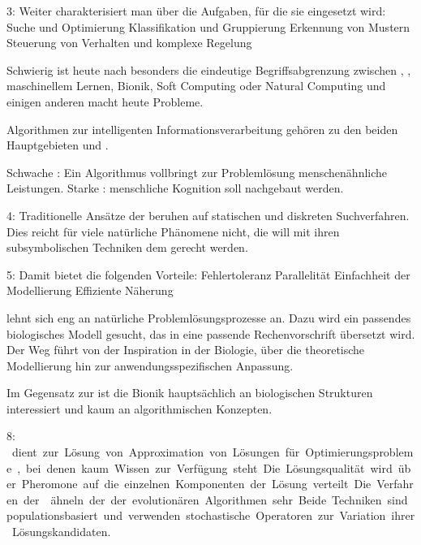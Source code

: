 3: Weiter charakterisiert man \II{} über die Aufgaben, für
die sie eingesetzt wird:
    Suche und Optimierung
    Klassifikation und Gruppierung
    Erkennung von Mustern
    Steuerung von Verhalten und komplexe Regelung

Schwierig ist heute nach
\citeauthor{bib:Kramer_2009_intelligence}
besonders die eindeutige Begriffsabgrenzung
zwischen \AI{}, \CI{}, maschinellem
Lernen, Bionik, Soft Computing oder Natural Computing und
einigen anderen macht heute Probleme.

Algorithmen zur intelligenten Informationsverarbeitung
gehören zu den beiden Hauptgebieten \CI{} und \AI{}.

Schwache \AI{}: Ein Algorithmus vollbringt zur Problemlösung
menschenähnliche Leistungen.
Starke \AI{}: menschliche Kognition soll nachgebaut werden.

4: Traditionelle Ansätze der \AI{} beruhen auf statischen
und diskreten Suchverfahren. Dies reicht für viele
natürliche Phänomene nicht, die \CI{} will mit ihren
subsymbolischen Techniken dem gerecht werden.

5: Damit bietet die \CI{} folgenden Vorteile:
    Fehlertoleranz
    Parallelität
    Einfachheit der Modellierung
    Effiziente Näherung

\CI{} lehnt sich eng an natürliche Problemlösungsprozesse
an. Dazu wird ein passendes biologisches Modell gesucht, das
in eine passende Rechenvorschrift übersetzt wird. Der Weg
führt von der Inspiration in der Biologie, über die
theoretische Modellierung hin zur anwendungsspezifischen
Anpassung.

Im Gegensatz zur \CI{} ist die Bionik hauptsächlich an
biologischen Strukturen interessiert und kaum an
algorithmischen Konzepten.

8: \SI{} dient zur Lösung von Approximation von Lösungen für
Optimierungsprobleme, bei denen kaum Wissen zur Verfügung
steht. Die Lösungsqualität wird über Pheromone auf die
einzelnen Komponenten der Lösung verteilt.

Die Verfahren der \SI{} ähneln der der evolutionären
Algorithmen sehr. Beide Techniken sind populationsbasiert
und verwenden stochastische Operatoren zur Variation ihrer
Lösungskandidaten.
